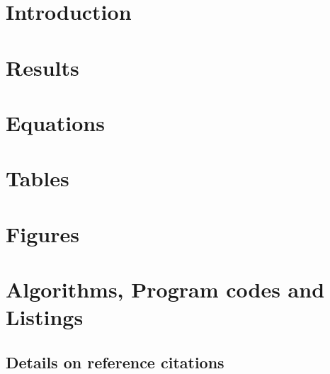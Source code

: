 \documentclass[pdflatex,sn-nature]{sn-jnl}%
\begin{document}
\linenumbers %




\keywords{}


\maketitle

\section{Introduction}\label{sec1}


\section{Results}\label{sec2}


\section{Equations}\label{sec4}


\section{Tables}\label{sec5}


\section{Figures}\label{sec6}


\section{Algorithms, Program codes and Listings}\label{sec7}



\subsection{Details on reference citations}\label{subsec9}
\end{document}
